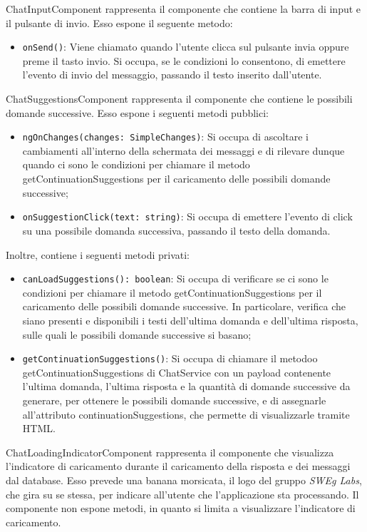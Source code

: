 \label{sec:chat_input_component}
ChatInputComponent rappresenta il componente che contiene la barra di input e il pulsante di invio.
Esso espone il seguente metodo:
\begin{itemize}
    \item \texttt{onSend()}: Viene chiamato quando l'utente clicca sul pulsante invia oppure preme il tasto invio. Si occupa, se le condizioni lo consentono, di emettere l'evento di invio del messaggio, passando il testo inserito dall'utente.
\end{itemize}

\label{sec:chat_suggestions_component}
ChatSuggestionsComponent rappresenta il componente che contiene le possibili domande successive.
Esso espone i seguenti metodi pubblici:
\begin{itemize}
    \item \texttt{ngOnChanges(changes: SimpleChanges)}: Si occupa di ascoltare i cambiamenti all'interno della schermata dei messaggi e di rilevare dunque quando ci sono le condizioni per chiamare il metodo getContinuationSuggestions per il caricamento delle possibili domande successive;
    \item \texttt{onSuggestionClick(text: string)}: Si occupa di emettere l'evento di click su una possibile domanda successiva, passando il testo della domanda.
\end{itemize}
Inoltre, contiene i seguenti metodi privati:
\begin{itemize}
    \item \texttt{canLoadSuggestions(): boolean}: Si occupa di verificare se ci sono le condizioni per chiamare il metodo getContinuationSuggestions per il caricamento delle possibili domande successive. In particolare, verifica che siano presenti e disponibili i testi dell'ultima domanda e dell'ultima risposta, sulle quali le possibili domande successive si basano;
    \item \texttt{getContinuationSuggestions()}: Si occupa di chiamare il metodoo getContinuationSuggestions di ChatService con un payload contenente l'ultima domanda, l'ultima risposta e la quantità di domande successive da generare, per ottenere le possibili domande successive, e di assegnarle all'attributo continuationSuggestions, che permette di visualizzarle tramite HTML.
\end{itemize}

\label{sec:chat_loading_indicator_component}
ChatLoadingIndicatorComponent rappresenta il componente che visualizza l'indicatore di caricamento durante il caricamento della risposta e dei messaggi dal database. Esso prevede una banana morsicata, il logo del gruppo \emph{SWEg Labs}, che gira su se stessa, per indicare all'utente che l'applicazione sta processando. Il componente non espone metodi, in quanto si limita a visualizzare l'indicatore di caricamento.

